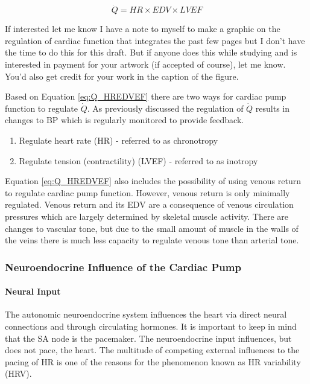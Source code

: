 \begin{equation}
    \dot{Q} = HR \times EDV \times LVEF
    \label{eq:Q_HREDVEF}
\end{equation}

\begin{question}{If interested let me know}
    I have a note to myself to make a graphic on the regulation of cardiac function that integrates the past few pages but I don't have the time to do this for this draft. But if anyone does this while studying and is interested in payment for your artwork (if accepted of course), let me know. You'd also get credit for your work in the caption of the figure.
\end{question}

Based on Equation \ref{eq:Q_HREDVEF} there are two ways for cardiac pump function to regulate $\dot{Q}$. As previously discussed the regulation of $\dot{Q}$ results in changes to BP which is regularly monitored to provide feedback.

\begin{enumerate}
    \item Regulate heart rate (HR) - referred to as chronotropy
    \item Regulate tension (contractility) (LVEF) - referred to as inotropy
\end{enumerate}

Equation \ref{eq:Q_HREDVEF} also includes the possibility of using venous return to regulate cardiac pump function. However, venous return is only minimally regulated. Venous return and its EDV are a consequence of venous circulation pressures which are largely determined by skeletal muscle activity. There are changes to vascular tone, but due to the small amount of muscle in the walls of the veins there is much less capacity to regulate venous tone than arterial tone. 

\subsubsection{Neuroendocrine Influence of the Cardiac Pump}

\paragraph{Neural Input}

The autonomic neuroendocrine system influences the heart via direct neural connections and through circulating hormones. It is important to keep in mind that the SA node is the pacemaker. The neuroendocrine input influences, but does not pace, the heart. The multitude of competing external influences to the pacing of HR is one of the reasons for the phenomenon known as HR variability (HRV). 

